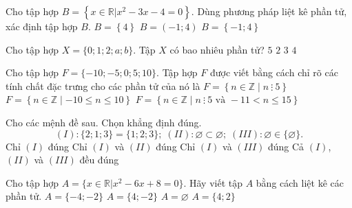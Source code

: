 \begin{ex}%
	Cho tập hợp $B = \left\{x \in \mathbb{R}\big| x^2 -  3x - 4 = 0\right\}$. Dùng phương pháp liệt kê phần tử, xác định tập hợp $B$.
		 {$B = \left\{4\right\}$}
		{$B  = \left(-1;4\right)$}
		{\True $B  = \left\{-1;4\right\}$}
\end{ex}

\begin{ex}%
	Cho tập hợp $X=\{0;1;2;a;b\}$. Tập $X$ có  bao nhiêu phần tử?
	 \choice
		 {\True $5$}
		{$2$} 
		 {$3$}
		{$4$} 
\end{ex}

\begin{ex}%
	Cho tập hợp $F = \{-10;-5;0;5;10\}$. Tập hợp $F$ được viết bằng cách chỉ rõ các tính chất đặc trưng cho các  phần tử của nó là
		{$F= \left\{ n \in \mathbb{Z} \mid n\ \vdots\ 5  \right\} $}
		{$F= \left\{  n \in \mathbb{Z} \mid -10 \le n \le 10 \right\} $}
		{$F= \left\{ n \in \mathbb{Z} \mid n\ \vdots\ 5 \text{ và } -11 < n \le 15  \right\} $}
\end{ex}

\begin{ex}%
	Cho các mệnh đề sau. Chọn khẳng định đúng. 
	\[(I): \{2;1;3\}=\{1;2;3\}; \; (II): \varnothing \subset \varnothing; \; (III): \varnothing  \in \{\varnothing\}.\]
	\choice 
		 {Chỉ $(I)$ đúng}
		{Chỉ $(I)$ và  $(II)$ đúng}
		{Chỉ $(I)$ và $(III)$ đúng} 
		{\True Cả $(I)$, $(II)$ và $(III)$ đều  đúng}
\end{ex}

\begin{ex}%
	Cho tập hợp $A=\{x\in\mathbb{R}| x^2-6x+8=0\}$. Hãy viết tập $A$ bằng cách  liệt kê các phần tử.
	\choice 
		{$A=\{-4;-2\}$} 
		 {$A=\{4;-2\}$}
		{$A=\varnothing$} 
		{\True $A=\{4;2\}$} 
\end{ex}

